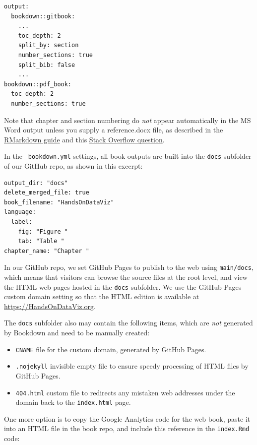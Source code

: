 \documentclass[
  english,
]{book}
\providecommand{\tightlist}{%
  \setlength{\itemsep}{0pt}\setlength{\parskip}{0pt}}
\begin{document}
\begin{verbatim}
output:
  bookdown::gitbook:
    ...
    toc_depth: 2
    split_by: section
    number_sections: true
    split_bib: false
    ...
bookdown::pdf_book:
  toc_depth: 2
  number_sections: true
\end{verbatim}

Note that chapter and section numbering do \emph{not} appear automatically in the MS Word output unless you supply a reference.docx file, as described in the \href{https://bookdown.org/yihui/rmarkdown/word-document.html}{RMarkdown guide} and this \href{https://stackoverflow.com/questions/52924766/numbering-and-referring-sections-in-bookdown}{Stack Overflow question}.

In the \texttt{\_bookdown.yml} settings, all book outputs are built into the \texttt{docs} subfolder of our GitHub repo, as shown in this excerpt:

\begin{verbatim}
output_dir: "docs"
delete_merged_file: true
book_filename: "HandsOnDataViz"
language:
  label:
    fig: "Figure "
    tab: "Table "
chapter_name: "Chapter "
\end{verbatim}

In our GitHub repo, we set GitHub Pages to publish to the web using \texttt{main/docs}, which means that visitors can browse the source files at the root level, and view the HTML web pages hosted in the \texttt{docs} subfolder. We use the GitHub Pages custom domain setting so that the HTML edition is available at \url{https://HandsOnDataViz.org}.

The \texttt{docs} subfolder also may contain the following items, which are \emph{not} generated by Bookdown and need to be manually created:

\begin{itemize}
\tightlist
\item
  \texttt{CNAME} file for the custom domain, generated by GitHub Pages.
\item
  \texttt{.nojekyll} invisible empty file to ensure speedy processing of HTML files by GitHub Pages.
\item
  \texttt{404.html} custom file to redirects any mistaken web addresses under the domain back to the \texttt{index.html} page.
\end{itemize}

One more option is to copy the Google Analytics code for the web book, paste it into an HTML file in the book repo, and include this reference in the \texttt{index.Rmd} code:
\end{document}
